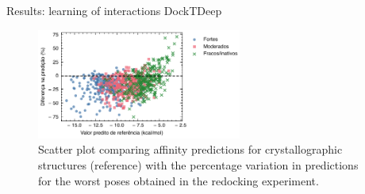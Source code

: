 \documentclass[aspectratio=169,xcolor=dvipsnames]{beamer}
\begin{document}
\begin{frame}{Results: learning of interactions \hfill {\footnotesize \alert{DockTDeep}}}
    \begin{figure}
        \centering
        \includegraphics[width=0.6\textwidth]{imgs/results/pose-sensitivity.pdf}
        \caption{Scatter plot comparing affinity predictions for crystallographic structures (reference) with the percentage variation in predictions for the worst poses obtained in the redocking experiment.}
    \end{figure}
\end{frame}
\end{document}
